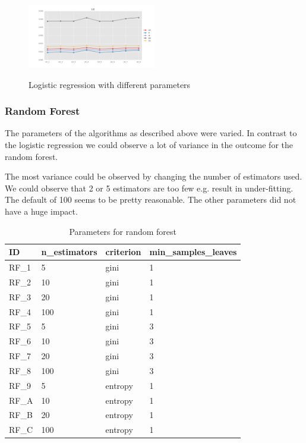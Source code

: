 \documentclass{sig-alternate-05-2015}
\begin{document}
\begin{figure}[h]
  \centering
  \caption{Logistic regression with different parameters}
  \includegraphics[width=0.5\textwidth]{../plots/LR_compare_param}
  \label{fig:lr}
\end{figure}

\subsubsection{Random Forest}
The parameters of the algorithms as described above were varied.
In contrast to the logistic regression we could observe a lot of variance in the outcome for the random forest.

The most variance could be observed by changing the number of estimators used. We could observe that 2 or 5 estimators are too few e.g. result in under-fitting. The default of 100 seems to be pretty reasonable. The other parameters did not have a huge impact.

\begin{table}[h]
\centering
\caption{Parameters for random forest}
\label{rf-table}
\begin{tabular}{|l|l|l|l|}
\hline
ID & n\_estimators & criterion & min\_samples\_leaves \\ \hline
RF\_1                    & 5             & gini      & 1                    \\ \hline
RF\_2                    & 10            & gini      & 1                    \\ \hline
RF\_3                    & 20            & gini      & 1                    \\ \hline
RF\_4                    & 100            & gini      & 1                    \\ \hline
RF\_5                    & 5             & gini      & 3                    \\ \hline
RF\_6                    & 10            & gini      & 3                    \\ \hline
RF\_7                    & 20            & gini      & 3                    \\ \hline
RF\_8                    & 100            & gini      & 3                    \\ \hline
RF\_9                    & 5             & entropy      & 1                    \\ \hline
RF\_A                    & 10            & entropy      & 1                    \\ \hline
RF\_B                    & 20            & entropy      & 1                    \\ \hline
RF\_C                    & 100            & entropy      & 1                    
\\ \hline
\end{tabular}
\end{table}
\end{document}
